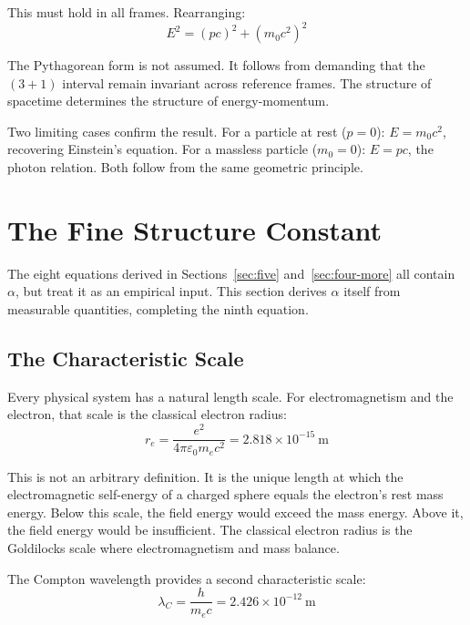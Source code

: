 \documentclass[aps,prd,preprint,superscriptaddress,showpacs,preprintnumbers,amsmath,amssymb,nofootinbib]{revtex4-2}
\begin{document}
This must hold in all frames. Rearranging:
\begin{equation}
E^2 = (pc)^2 + (m_0 c^2)^2
\end{equation}

The Pythagorean form is not assumed. It follows from demanding that the $(3+1)$ interval remain invariant across reference frames. The structure of spacetime determines the structure of energy-momentum.

Two limiting cases confirm the result. For a particle at rest ($p = 0$): $E = m_0 c^2$, recovering Einstein's equation. For a massless particle ($m_0 = 0$): $E = pc$, the photon relation. Both follow from the same geometric principle.

\section{The Fine Structure Constant}
\label{sec:alpha}

The eight equations derived in Sections~\ref{sec:five} and~\ref{sec:four-more} all contain $\alpha$, but treat it as an empirical input. This section derives $\alpha$ itself from measurable quantities, completing the ninth equation.

\subsection{The Characteristic Scale}
\label{subsec:alpha-scale}

Every physical system has a natural length scale. For electromagnetism and the electron, that scale is the classical electron radius:
\begin{equation}
r_e = \frac{e^2}{4\pi\varepsilon_0 m_e c^2} = 2.818 \times 10^{-15}~\text{m}
\end{equation}

This is not an arbitrary definition. It is the unique length at which the electromagnetic self-energy of a charged sphere equals the electron's rest mass energy. Below this scale, the field energy would exceed the mass energy. Above it, the field energy would be insufficient. The classical electron radius is the Goldilocks scale where electromagnetism and mass balance.

The Compton wavelength provides a second characteristic scale:
\begin{equation}
\lambda_C = \frac{h}{m_e c} = 2.426 \times 10^{-12}~\text{m}
\end{equation}
\end{document}
